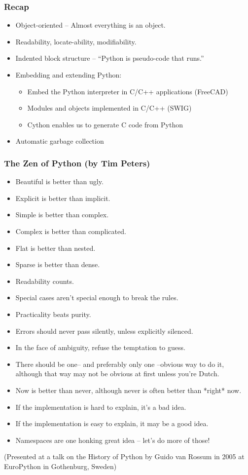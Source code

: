 \begin{frame}\frametitle{Recap}

\begin{itemize}
\item Object-oriented -- Almost everything is an object.
\item Readability, locate-ability, modifiability.
\item Indented block structure -- ``Python is pseudo-code that runs.''
\item Embedding and extending Python:
\begin{itemize}
\item  Embed the Python interpreter in C/C++ applications (FreeCAD)
\item  Modules and objects implemented in C/C++ (SWIG)
\item Cython enables us to generate C code from Python
\end{itemize}
\item Automatic garbage collection
\end{itemize}
\end{frame}


\begin{frame}\frametitle{The Zen of Python (by Tim Peters)}
\scriptsize
\begin{itemize}
\item Beautiful is better than ugly.
\item Explicit is better than implicit.
\item Simple is better than complex.
\item Complex is better than complicated.
\item Flat is better than nested.
\item Sparse is better than dense.
\item Readability counts.
\item Special cases aren't special enough to break the rules.
\item Practicality beats purity.
\item Errors should never pass silently, unless explicitly silenced.
\item In the face of ambiguity, refuse the temptation to guess.
\item There should be one-- and preferably only one --obvious way to do it, although that way may not be obvious at first unless you're Dutch.
\item Now is better than never, although never is often better than *right* now.
\item If the implementation is hard to explain, it's a bad idea.
\item If the implementation is easy to explain, it may be a good idea.
\item Namespaces are one honking great idea -- let's do more of those!
\end{itemize}
(Presented at a talk on the History of Python by Guido van Rossum in 2005 at EuroPython in Gothenburg, Sweden)
\end{frame}

